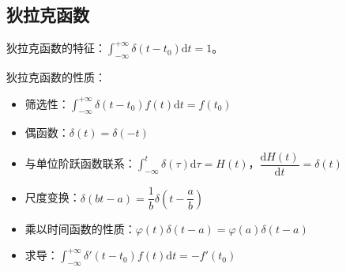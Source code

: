 \documentclass[UTF8]{ctexart}
\renewcommand\i{\mathrm{i}}
\newcommand\e{\mathrm{e}}
\renewcommand\d{\mathrm{d}}
\renewcommand\pi{\text{\tm π}}
\newcommand\w{\omega}
\newcommand\fbh{\xrightarrow{\quad \mathcal{F} \quad}} %
\begin{document}

\subsection{狄拉克函数}
狄拉克函数的特征：$\displaystyle\int_{-\infty}^{+\infty} \delta(t-t_0) \d t = 1$。

狄拉克函数的性质：
\begin{itemize}
    \item 筛选性：$\displaystyle \int_{-\infty}^{+\infty} \delta(t-t_0) f(t)\d t = f(t_0)$
    \item 偶函数：$\delta(t) = \delta(-t)$
    \item 与单位阶跃函数联系：$\displaystyle \int_{-\infty}^t  \delta(\tau)\d\tau = H(t)$，$\dfrac{\d H(t)}{\d t} = \delta (t) $
    \item 尺度变换：$\delta (bt-a) = \dfrac1b \delta \left(t-\dfrac ab\right)$
    \item 乘以时间函数的性质：$\varphi (t) \delta (t-a) = \varphi(a)\delta (t-a)$
    \item 求导：$\displaystyle \int_{-\infty}^{+\infty}  \delta'(t-t_0) f(t)\d t = -f'(t_0)$
\end{itemize}
\end{document}
